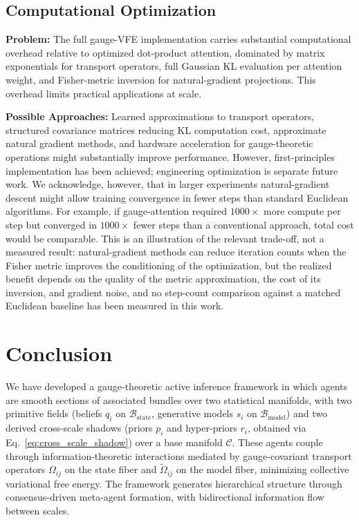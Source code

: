\documentclass[11pt]{article}
\begin{document}
\subsection{Computational Optimization}

\textbf{Problem:} The full gauge-VFE implementation carries substantial computational overhead relative to optimized dot-product attention, dominated by matrix exponentials for transport operators, full Gaussian KL evaluation per attention weight, and Fisher-metric inversion for natural-gradient projections. This overhead limits practical applications at scale.

\textbf{Possible Approaches:} Learned approximations to transport operators, structured covariance matrices reducing KL computation cost, approximate natural gradient methods, and hardware acceleration for gauge-theoretic operations might substantially improve performance. However, first-principles implementation has been achieved; engineering optimization is separate future work. We acknowledge, however, that in larger experiments natural-gradient descent might allow training convergence in fewer steps than standard Euclidean algorithms. For example, if gauge-attention required $1000\times$ more compute per step but converged in $1000\times$ fewer steps than a conventional approach, total cost would be comparable. This is an illustration of the relevant trade-off, not a measured result: natural-gradient methods can reduce iteration counts when the Fisher metric improves the conditioning of the optimization, but the realized benefit depends on the quality of the metric approximation, the cost of its inversion, and gradient noise, and no step-count comparison against a matched Euclidean baseline has been measured in this work.

\section{Conclusion}
\label{sec:conclusion}

We have developed a gauge-theoretic active inference framework in which agents are smooth sections of associated bundles over two statistical manifolds, with two primitive fields (beliefs $q_i$ on $\mathcal{B}_{\mathrm{state}}$, generative models $s_i$ on $\mathcal{B}_{\mathrm{model}}$) and two derived cross-scale shadows (priors $p_i$ and hyper-priors $r_i$, obtained via Eq.~\eqref{eq:cross_scale_shadow}) over a base manifold $\mathcal{C}$. These agents couple through information-theoretic interactions mediated by gauge-covariant transport operators $\Omega_{ij}$ on the state fiber and $\tilde\Omega_{ij}$ on the model fiber, minimizing collective variational free energy. The framework generates hierarchical structure through consensus-driven meta-agent formation, with bidirectional information flow between scales.
\end{document}
